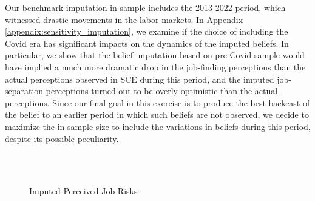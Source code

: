 Our benchmark imputation in-sample includes the 2013-2022 period, which witnessed drastic movements in the labor markets. In Appendix \ref{appendix:sensitivity_imputation}, we examine if the choice of including the Covid era has significant impacts on the dynamics of the imputed beliefs. In particular, we show that the belief imputation based on pre-Covid sample would have implied a much more dramatic drop in the job-finding perceptions than the actual perceptions observed in SCE during this period, and the imputed job-separation perceptions turned out to be overly optimistic than the actual perceptions. Since our final goal in this exercise is to produce the best backcast of the belief to an earlier period in which such beliefs are not observed, we decide to maximize the in-sample size to include the variations in beliefs during this period, despite its possible peculiarity.  

      \begin{figure}[pt]
    	\caption{Imputed Perceived Job Risks}
    	\label{fig:impute_2step}
    	\begin{center}
	 \\
  \\
    	\end{center}
    \end{figure}



    
